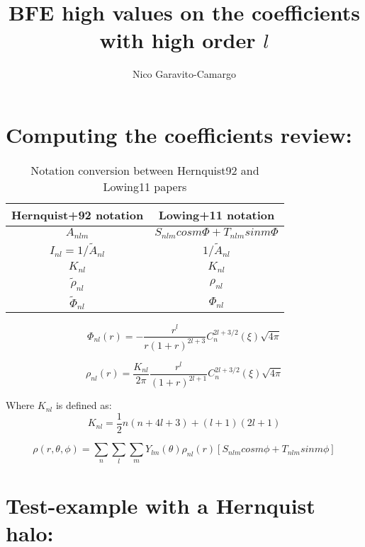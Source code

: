 \documentclass[14pt]{article}
\title{BFE high values on the coefficients with high order $l$}
\author{Nico Garavito-Camargo}
\begin{document}
\maketitle

\section{Computing the coefficients review:}


\begin{table}[h]
  \centering
  \begin{tabular}{c  c}
    \hline
    \hline
    Hernquist+92 notation & Lowing+11 notation \\
    \hline
    $A_{nlm}$ & $S_{nlm} cos m\Phi + T_{nlm}sin m\Phi $\\
    $I_{nl} = 1/\tilde{A}_{nl}$ & $1/\tilde{A}_{nl}$\\
    $K_{nl}$ & $K_{nl}$ \\
    $\tilde{\rho}_{nl}$ & $\rho_{nl}$\\
    $\tilde{\Phi}_{nl}$ & $\Phi_{nl}$\\
    \hline
    \hline
  \end{tabular}
  \caption{Notation conversion between Hernquist92 and Lowing11 papers}
\end{table}


\begin{equation}
  \Phi_{nl}(r) = - \dfrac{r^l}{r(1+r)^{2l+3}}C_{n}^{2l+3/2}(\xi)\sqrt{4\pi}
\end{equation}



\begin{equation}
  \rho_{nl}(r) = \dfrac{K_{nl}}{2\pi}\dfrac{r^l}{(1+r)^{2l+1}}C_{n}^{2l+3/2}(\xi)\sqrt{4\pi}
\end{equation}

Where $K_{nl}$ is defined as:
\begin{equation}
    K_{nl}=\dfrac{1}{2}n(n+4l+3) +(l+1)(2l+1)
\end{equation}

\begin{equation}
  \rho(r, \theta, \phi) = \sum_{n} \sum_l \sum_m Y_{lm}(\theta) \rho_{nl}(r)
  \left[ S_{nlm} cos m\phi + T_{nlm} sin m \phi \right]
\end{equation}

\section{Test-example with a Hernquist halo:}
\end{document}
